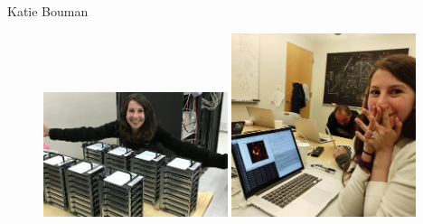 \documentclass{beamer}
\begin{document}
\begin{frame}{Katie Bouman}
    \begin{figure}
        \includegraphics[width=0.48\textwidth]{figs/katie2.png}
        \includegraphics[width=0.48\textwidth]{figs/katie3.jpg}
    \end{figure}
\end{frame}
\end{document}
